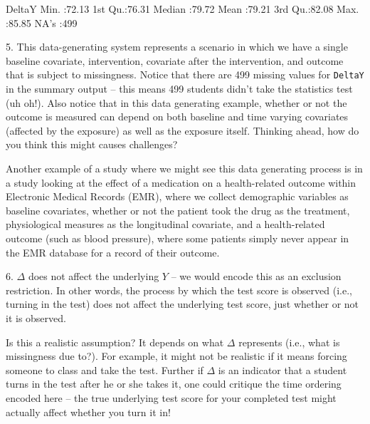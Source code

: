 \documentclass{exam}
\newenvironment{myfigure}{\captionsetup{type=mytype}}{}
\begin{document}
\begin{solution}
\begin{Schunk}
\begin{Soutput}
     DeltaY     
 Min.   :72.13  
 1st Qu.:76.31  
 Median :79.72  
 Mean   :79.21  
 3rd Qu.:82.08  
 Max.   :85.85  
 NA's   :499    
\end{Soutput}
\end{Schunk}

5. This data-generating system represents a scenario in which we have a single baseline covariate, intervention, covariate after the intervention, and outcome that is subject to missingness. Notice that there are 499 missing values for \texttt{DeltaY} in the summary output -- this means 499 students didn't take the statistics test (uh oh!). Also notice that in this data generating example, whether or not the outcome is measured can depend on both baseline and time varying covariates (affected by the exposure) as well as the exposure itself. Thinking ahead, how do you think this might causes challenges? 

Another example of a study where we might see this data generating process is in a study looking at the effect of a medication on a health-related outcome within Electronic Medical Records (EMR), where we collect demographic variables as baseline covariates, whether or not the patient took the drug as the treatment, physiological measures as the longitudinal covariate, and a health-related outcome (such as blood pressure), where some patients simply never appear in the EMR database for a record of their outcome.


6. $\Delta$ does not affect the underlying $Y$ -- we would encode this as an exclusion restriction. In other words, the process by which the test score is observed (i.e., turning in the test) does not affect the underlying test score, just whether or not it is observed.

Is this a realistic assumption? It depends on what $\Delta$ represents (i.e., what is missingness due to?). For example, it might not be realistic if it means forcing someone to class and take the test. Further if $\Delta$ is an indicator that a student turns in the test after he or she takes it, one could critique the time ordering encoded here -- the true underlying test score for your completed test might actually affect whether you turn it in!
\end{solution}
\end{document}
